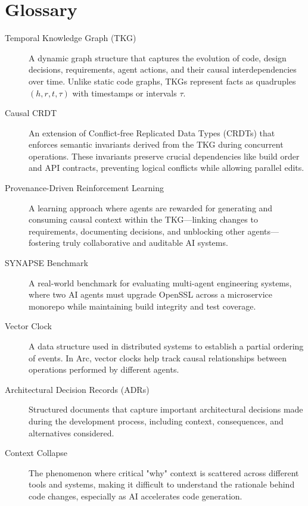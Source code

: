 \section*{Glossary}

\begin{description}
\item[Temporal Knowledge Graph (TKG)] A dynamic graph structure that captures the evolution of code, design decisions, requirements, agent actions, and their causal interdependencies over time. Unlike static code graphs, TKGs represent facts as quadruples $(h,r,t,\tau)$ with timestamps or intervals $\tau$.

\item[Causal CRDT] An extension of Conflict-free Replicated Data Types (CRDTs) that enforces semantic invariants derived from the TKG during concurrent operations. These invariants preserve crucial dependencies like build order and API contracts, preventing logical conflicts while allowing parallel edits.

\item[Provenance-Driven Reinforcement Learning] A learning approach where agents are rewarded for generating and consuming causal context within the TKG—linking changes to requirements, documenting decisions, and unblocking other agents—fostering truly collaborative and auditable AI systems.

\item[SYNAPSE Benchmark] A real-world benchmark for evaluating multi-agent engineering systems, where two AI agents must upgrade OpenSSL across a microservice monorepo while maintaining build integrity and test coverage.

\item[Vector Clock] A data structure used in distributed systems to establish a partial ordering of events. In Arc, vector clocks help track causal relationships between operations performed by different agents.

\item[Architectural Decision Records (ADRs)] Structured documents that capture important architectural decisions made during the development process, including context, consequences, and alternatives considered.

\item[Context Collapse] The phenomenon where critical "why" context is scattered across different tools and systems, making it difficult to understand the rationale behind code changes, especially as AI accelerates code generation.


\end{description}
